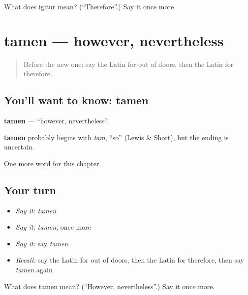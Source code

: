 \begin{tcolorbox}[breakable,colback=teal!4,colframe=teal!35!black,title={Before you move on}]
What does igitur mean? (\textquotedblleft{}Therefore\textquotedblright{}.) Say it once more.
\end{tcolorbox}
\section[tamen]{tamen — however, nevertheless}

\label{lesson:LA-C178-tamen}



\begin{quote}
Before the new one: say the Latin for out of doors, then the Latin for therefore.
\end{quote}

\subsection*{You'll want to know: tamen}
\textbf{tamen} — \textquotedblleft{}however, nevertheless\textquotedblright{}.

\begin{cousinweb}
\textbf{tamen} probably begins with \emph{tam}, \textquotedblleft{}so\textquotedblright{} (Lewis \& Short), but the ending is uncertain.
\end{cousinweb}

\begin{grammarlens}[title={What you've built}]
One more word for this chapter.
\end{grammarlens}

\subsection*{Your turn}
\begin{itemize}
\raggedright
  \item \emph{Say it:} \emph{tamen}
  \item \emph{Say it:} \emph{tamen}, once more
  \item \emph{Say it:} say \emph{tamen}
  \item \emph{Recall:} say the Latin for out of doors, then the Latin for therefore, then say \emph{tamen} again
\end{itemize}

\begin{tcolorbox}[breakable,colback=teal!4,colframe=teal!35!black,title={Before you move on}]
What does tamen mean? (\textquotedblleft{}However, nevertheless\textquotedblright{}.) Say it once more.
\end{tcolorbox}
